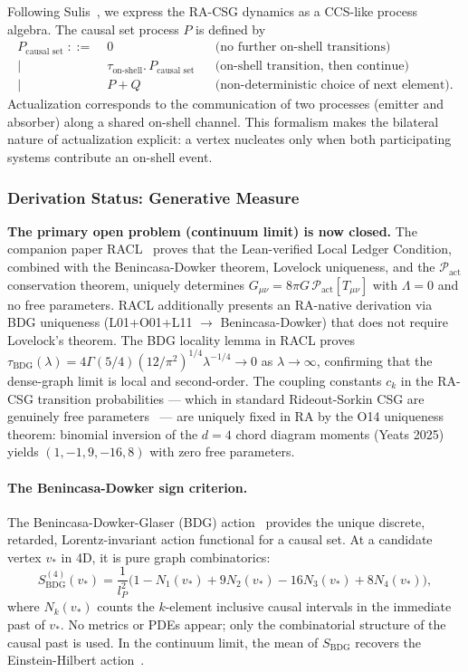 \documentclass[11pt,a4paper]{article}
\theoremstyle{plain}
\theoremstyle{definition}
\theoremstyle{remark}
\begin{document}
Following Sulis~\citep{Sulis2020}, we express the RA-CSG dynamics as a
CCS-like process algebra. The causal set process $P$ is defined by
\begin{align*}
  P_{\text{causal set}} \;::=\;&
    0 & &\text{(no further on-shell transitions)}\\
    \mid\;& \tau_{\text{on-shell}}.\,P_{\text{causal set}}
            & &\text{(on-shell transition, then continue)}\\
    \mid\;& P + Q
            & &\text{(non-deterministic choice of next element).}
\end{align*}
Actualization corresponds to the communication of two processes (emitter and
absorber) along a shared on-shell channel. This formalism makes the bilateral
nature of actualization explicit: a vertex nucleates only when both participating
systems contribute an on-shell event.

\subsubsection{Derivation Status: Generative Measure}

\textbf{The primary open problem (continuum limit) is now closed.}
The companion paper RACL~\citep{Sandeman2026RACL} proves that the
Lean-verified Local Ledger Condition, combined with the Benincasa-Dowker
theorem, Lovelock uniqueness, and the $\mathcal{P}_{\mathrm{act}}$
conservation theorem, uniquely determines
$G_{\mu\nu} = 8\pi G\,\mathcal{P}_{\mathrm{act}}[T_{\mu\nu}]$ with
$\Lambda = 0$ and no free parameters. RACL additionally presents an
RA-native derivation via BDG uniqueness (L01+O01+L11 $\to$ Benincasa-Dowker)
that does not require Lovelock's theorem. The BDG locality lemma in RACL
proves $\tau_{\mathrm{BDG}}(\lambda) = 4\Gamma(5/4)(12/\pi^2)^{1/4}
\lambda^{-1/4} \to 0$ as $\lambda \to \infty$, confirming that
the dense-graph limit is local and second-order.
The coupling constants $c_k$ in the RA-CSG transition probabilities ---
which in standard Rideout-Sorkin CSG are genuinely free
parameters~\citep{Sorkin2003} --- are uniquely fixed in RA by the O14
uniqueness theorem: binomial inversion of the $d=4$ chord diagram
moments (Yeats 2025) yields $(1,-1,9,-16,8)$ with zero free parameters.

\paragraph{The Benincasa-Dowker sign criterion.}
The Benincasa-Dowker-Glaser (BDG) action~\citep{Benincasa2010} provides the
unique discrete, retarded, Lorentz-invariant action functional for a causal set.
At a candidate vertex $v_*$ in 4D, it is pure graph combinatorics:
\begin{equation}
  S_{\mathrm{BDG}}^{(4)}(v_*)
  = \frac{1}{l_P^2}
    \bigl(1 - N_1(v_*) + 9N_2(v_*) - 16N_3(v_*) + 8N_4(v_*)\bigr),
  \label{eq:BDG}
\end{equation}
where $N_k(v_*)$ counts the $k$-element inclusive causal intervals in the
immediate past of $v_*$. No metrics or PDEs appear; only the combinatorial
structure of the causal past is used. In the continuum limit, the mean of
$S_{\mathrm{BDG}}$ recovers the Einstein-Hilbert action~\citep{Benincasa2010}.
\end{document}
